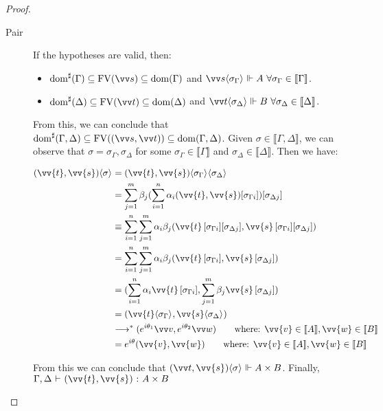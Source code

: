 \documentclass[runningheads,orivec,envcountsame,envcountsect]{llncs}
\newcommand\lra{\longrightarrow}
\newcommand\ansubst[2]{\ensuremath{\langle #1 \rangle_{#2}}}
\newcommand\dom[1]{\mathrm{dom}(#1)}
\newcommand\sdom[1]{\mathrm{dom}^{\sharp}(#1)}
\newcommand\FV[1]{\mathrm{FV}(#1)}
\def\Pair#1#2{(#1,#2)} %
\def\eval{\lra^*}
\def\sem#1{\llbracket#1\rrbracket}
\def\TYP#1#2#3{#1~{\vdash}~#2~{:}~#3}
\def\real{\Vdash}
\begin{document}
\begin{proof}
\begin{description}
    \item[Pair] If the hypotheses are valid, then:

    \begin{itemize}
        \item $\sdom{\Gamma}\subseteq \FV{\vv s}\subseteq \dom{\Gamma}$ and $\vv s \ansubst{\sigma_\Gamma}{}\Vdash A\ \forall \sigma_\Gamma\in\sem{\Gamma}$.
        \item $\sdom{\Delta}\subseteq \FV{\vv t}\subseteq \dom{\Delta}$ and $\vv t\ansubst{\sigma_\Delta}{}\Vdash B\ \forall \sigma_\Delta\in\sem{\Delta}$.
    \end{itemize}
    
    From this, we can conclude that $\sdom{\Gamma,\Delta}\subseteq \FV{(\vv s, \vv t)}\subseteq \dom{\Gamma,\Delta}$. Given $\sigma\in\sem{\Gamma,\Delta}$, we can observe that $\sigma=\sigma_\Gamma,\sigma_\Delta$ for some  $\sigma_\Gamma\in\sem{\Gamma}$ and $\sigma_\Delta\in\sem{\Delta}$. Then we have:

    \begin{align*}
        \Pair{\vv{t}}{\vv{s}}\ansubst{\sigma}{} &= \Pair{\vv{t}}{\vv{s}}\ansubst{\sigma_\Gamma}{}\ansubst{\sigma_\Delta}{}\\
        &=\sum_{j=1}^{m} \beta_j (\sum_{i=1}^{n} \alpha_i \Pair{\vv{t}}{\vv{s}}[\sigma_{\Gamma i}])[\sigma_{\Delta j}]\\
        &\equiv\sum_{i=1}^{n}\sum_{j=1}^{m} \alpha_i \beta_j \Pair{\vv{t}\,[\sigma_{\Gamma i}][\sigma_{\Delta j}]}{\vv{s}\,[\sigma_{\Gamma i}][\sigma_{\Delta j}]}\\
        &=\sum_{i=1}^{n}\sum_{j=1}^{m} \alpha_i \beta_j \Pair{\vv{t}\,[\sigma_{\Gamma i}]}{\vv{s}\,[\sigma_{\Delta j}]}\\
        &=\Pair{\sum_{i=1}^{n} \alpha_i \vv{t}\, [\sigma_{\Gamma i}]}{\sum_{j=1}^{m} \beta_j \vv{s}\, [\sigma_{\Delta j}]}\\
        &=\Pair{\vv{t}\ansubst{\sigma_\Gamma}{}}{\vv{s}\ansubst{\sigma_\Delta}{}}\\
        &\eval \Pair{e^{i\theta_1}\vv v}{e^{i\theta_2}\vv w}\qquad\text{where: }\vv{v}\in\sem{A}, \vv{w}\in\sem{B}\\
        &= e^{i\theta} \Pair{\vv{v}}{\vv{w}}\qquad\text{where: }\vv{v}\in\sem{A},\vv{w}\in\sem{B}
    \end{align*}
    
    From this we can conclude that $\Pair{\vv t}{\vv{s}}\ansubst{\sigma}{}\real A\times B$. Finally, $\TYP{\Gamma,\Delta}{\Pair{\vv{t}}{\vv{s}}}{A\times B}$
    

\end{description}
\end{proof}
\end{document}
